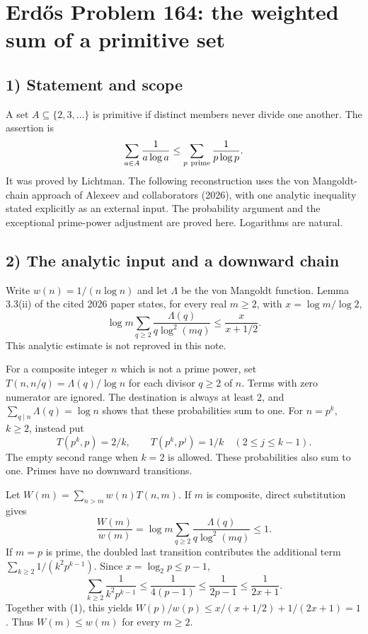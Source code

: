 \section{Erd\H{o}s Problem 164: the weighted sum of a primitive set}

\subsection{1) Statement and scope}
A set $A\subseteq\{2,3,\ldots\}$ is primitive if distinct members never
divide one another. The assertion is
\[
 \sum_{a\in A}\frac1{a\log a}
 \leq \sum_{p\ {\rm prime}}\frac1{p\log p}.
\]
It was proved by Lichtman. The following reconstruction uses the von
Mangoldt-chain approach of Alexeev and collaborators (2026), with one
analytic inequality stated explicitly as an external input. The
probability argument and the exceptional prime-power adjustment are
proved here. Logarithms are natural.

\subsection{2) The analytic input and a downward chain}
Write $w(n)=1/(n\log n)$ and let $\Lambda$ be the von Mangoldt function.
Lemma 3.3(ii) of the cited 2026 paper states, for every real $m\geq2$,
with $x=\log m/\log2$,
\[
 \log m\sum_{q\geq2}\frac{\Lambda(q)}{q\log^2(mq)}
 \leq\frac{x}{x+1/2}.                                      \tag{1}
\]
This analytic estimate is not reproved in this note.

For a composite integer $n$ which is not a prime power, set
$T(n,n/q)=\Lambda(q)/\log n$ for each divisor $q\geq2$ of $n$.
Terms with zero numerator are ignored. The destination is always at
least $2$, and $\sum_{q\mid n}\Lambda(q)=\log n$ shows that these
probabilities sum to one. For $n=p^k$, $k\geq2$, instead put
\[
 T(p^k,p)=2/k,\qquad
 T(p^k,p^j)=1/k\quad(2\leq j\leq k-1).
\]
The empty second range when $k=2$ is allowed. These probabilities also
sum to one. Primes have no downward transitions.

Let $W(m)=\sum_{n>m}w(n)T(n,m)$. If $m$ is composite, direct substitution
gives
\[
 \frac{W(m)}{w(m)}=
 \log m\sum_{q\geq2}\frac{\Lambda(q)}{q\log^2(mq)}\leq1.
\]
If $m=p$ is prime, the doubled last transition contributes the additional
term $\sum_{k\geq2}1/(k^2p^{k-1})$. Since $x=\log_2p\leq p-1$,
\[
 \sum_{k\geq2}\frac1{k^2p^{k-1}}
 \leq\frac1{4(p-1)}\leq\frac1{2p-1}
 \leq\frac1{2x+1}.
\]
Together with (1), this yields $W(p)/w(p)\leq
x/(x+1/2)+1/(2x+1)=1$. Thus $W(m)\leq w(m)$ for every $m\geq2$.

